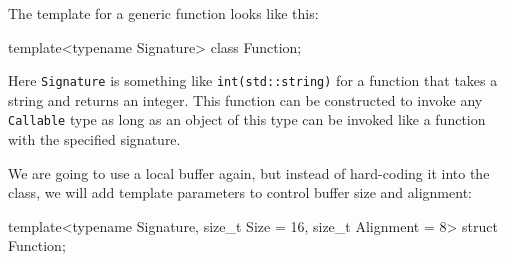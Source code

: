 The template for a generic function looks like this:

\begin{code}
template<typename Signature> class Function;
\end{code}

Here \texttt{Signature} is something like \texttt{int(std::string)} for a function that takes a string and returns an integer. This function can be constructed to invoke any \texttt{Callable} type as long as an object of this type can be invoked like a function with the specified signature.

We are going to use a local buffer again, but instead of hard-coding it into the class, we will add template parameters to control buffer size and alignment:

\begin{code}
template<typename Signature, size_t Size = 16,
         size_t Alignment = 8> struct Function;
\end{code}

